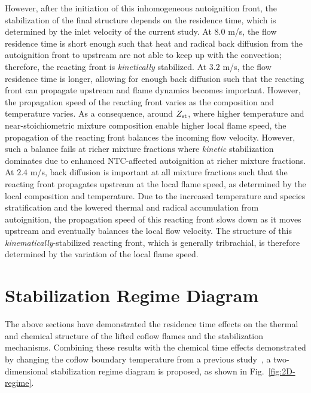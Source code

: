 \documentclass{wssci}
\begin{document}
However, after the initiation of this inhomogeneous autoignition front, the stabilization of the final structure depends on the residence time, which is determined by the inlet velocity of the current study.  At $8.0$ m/s, the flow residence time is short enough such that heat and radical back diffusion from the autoignition front to upstream are not able to keep up with the convection; therefore, the reacting front is \emph{kinetically} stabilized.  At $3.2$ m/s, the flow residence time is longer, allowing for enough back diffusion such that the reacting front can propagate upstream and flame dynamics becomes important.  However, the propagation speed of the reacting front varies as the composition and temperature varies.  As a consequence, around $Z_{\rm st}$, where higher temperature and near-stoichiometric mixture composition enable higher local flame speed, the propagation of the reacting front balances the incoming flow velocity.  However, such a balance fails at richer mixture fractions where \emph{kinetic} stabilization dominates due to enhanced NTC-affected autoignition at richer mixture fractions.  At $2.4$ m/s, back diffusion is important at all mixture fractions such that the reacting front propagates upstream at the local flame speed, as determined by the local composition and temperature.  Due to the increased temperature and species stratification and the lowered thermal and radical accumulation from autoignition, the propagation speed of this reacting front slows down as it moves upstream and eventually balances the local flow velocity.  The structure of this \emph{kinematically}-stabilized reacting front, which is generally tribrachial, is therefore determined by the variation of the local flame speed.


        
\section{Stabilization Regime Diagram}

The above sections have demonstrated the residence time effects on the thermal and chemical structure of the lifted coflow flames and the stabilization mechanisms.  Combining these results with the chemical time effects demonstrated by changing the coflow boundary temperature from a previous study~\cite{deng15}, a two-dimensional stabilization regime diagram is proposed, as shown in Fig.~\ref{fig:2D-regime}.  
\end{document}
